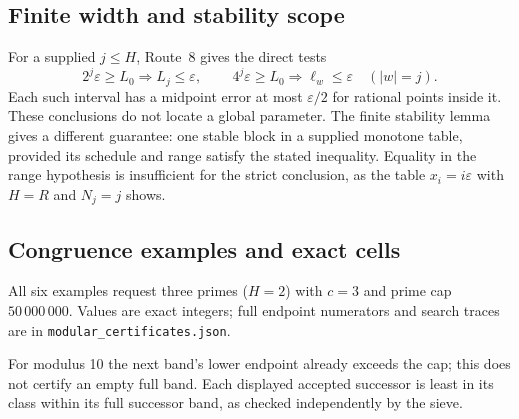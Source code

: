 \documentclass[11pt,reqno]{amsart}
\newlength{\CenteredRowHeight}
\newcommand{\CenteredTableWidths}[6]{%
  \def\CenteredWidthA{#1}\def\CenteredWidthB{#2}%
  \def\CenteredWidthC{#3}\def\CenteredWidthD{#4}%
  \def\CenteredWidthE{#5}\def\CenteredWidthF{#6}}
\newcommand{\CenteredMeasure}[3]{%
  \global\setbox#1=\hbox{\parbox[c]{#2}{%
    \centering\setlength{\parindent}{0pt}#3\par}}%
  \ifdim\dimexpr\ht#1+\dp#1\relax>\CenteredRowHeight
    \global\CenteredRowHeight=\dimexpr\ht#1+\dp#1\relax
  \fi}
\newcommand{\CenteredRender}[2]{%
  \parbox[c][\CenteredRowHeight][c]{#2}{%
    \centering\setlength{\parindent}{0pt}\usebox{#1}\par}}
\newcommand{\CenteredRowFour}[5][0pt]{%
  \global\CenteredRowHeight=0pt\relax%
  \CenteredMeasure{\CenteredBoxA}{\CenteredWidthA}{#2}%
  \CenteredMeasure{\CenteredBoxB}{\CenteredWidthB}{#3}%
  \CenteredMeasure{\CenteredBoxC}{\CenteredWidthC}{#4}%
  \CenteredMeasure{\CenteredBoxD}{\CenteredWidthD}{#5}%
  \global\advance\CenteredRowHeight by \dimexpr 2pt+#1\relax%
  \CenteredRender{\CenteredBoxA}{\CenteredWidthA} &%
  \CenteredRender{\CenteredBoxB}{\CenteredWidthB} &%
  \CenteredRender{\CenteredBoxC}{\CenteredWidthC} &%
  \CenteredRender{\CenteredBoxD}{\CenteredWidthD}}
\theoremstyle{blueplain}
\providecommand{\comma}{\allowbreak,\,}
\numberwithin{equation}{section}
\begin{document}
\subsection{Finite width and stability scope}
For a supplied \(j\le H\), Route~8 gives the direct tests
\[
2^j\varepsilon\ge L_0\Rightarrow L_j\le\varepsilon\comma\qquad
4^j\varepsilon\ge L_0\Rightarrow\ell_w\le\varepsilon\quad(|w|=j).
\]
Each such interval has a midpoint error at most \(\varepsilon/2\) for
rational points inside it. These conclusions do not locate a global
parameter. The finite stability lemma gives a different guarantee:
one stable block in a supplied monotone table, provided its schedule and
range satisfy the stated inequality. Equality in the range hypothesis
is insufficient for the strict conclusion, as the table
\(x_i=i\varepsilon\) with \(H=R\) and \(N_j=j\) shows.



\subsection{Congruence examples and exact cells}\label{sec:mod-examples}
All six examples request three primes (\(H=2\)) with \(c=3\) and
prime cap \(50\,000\,000\). Values are exact integers; full endpoint
numerators and search traces are in \texttt{modular\_certificates.json}.
\begin{center}\scriptsize
\CenteredTableWidths{0.8cm}{0.8cm}{7cm}{6.8cm}{1pt}{1pt}
\end{center}
For modulus 10 the next band's lower endpoint already exceeds the cap;
this does not certify an empty full band. Each displayed accepted
successor is least in its class within its full successor band, as
checked independently by the sieve.
\end{document}
